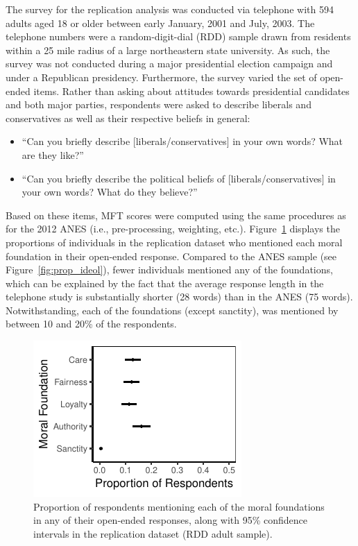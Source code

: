 \documentclass[12pt]{article}
\begin{document}
The survey for the replication analysis was conducted via telephone with 594 adults aged 18 or older between early January, 2001 and July, 2003. The telephone numbers were a random-digit-dial (RDD) sample drawn from residents within a 25 mile radius of a large northeastern state university. As such, the survey was not conducted during a  major presidential election campaign and under a Republican presidency. Furthermore, the survey varied the set of open-ended items. Rather than asking about attitudes towards presidential candidates and both major parties, respondents were asked to describe liberals and conservatives as well as their respective beliefs in general:
\begin{itemize}
\item ``Can you briefly describe [liberals/conservatives] in your own words? What are they like?''
\item ``Can you briefly describe the political beliefs of [liberals/conservatives] in your own words? What do they believe?''
\end{itemize}
Based on these items, MFT scores were computed using the same procedures as for the 2012 ANES (i.e., pre-processing, weighting, etc.). Figure~\ref{fig:prop_lisurvey} displays the proportions of individuals in the replication dataset who mentioned each moral foundation in their open-ended response. Compared to the ANES sample (see Figure~\ref{fig:prop_ideol}), fewer individuals mentioned any of the foundations, which can be explained by the fact that the average response length in the telephone study is substantially shorter (28 words) than in the ANES (75 words). Notwithstanding, each of the foundations (except sanctity), was mentioned by between 10 and 20\% of the respondents.

\begin{figure}[ht]\centering
\includegraphics{../calc/fig/prop_lisurvey.pdf}
\caption{Proportion of respondents mentioning each of the moral foundations in any of their open-ended responses, along with 95\% confidence intervals in the replication dataset (RDD adult sample).}\label{fig:prop_lisurvey}
\end{figure}
\end{document}
